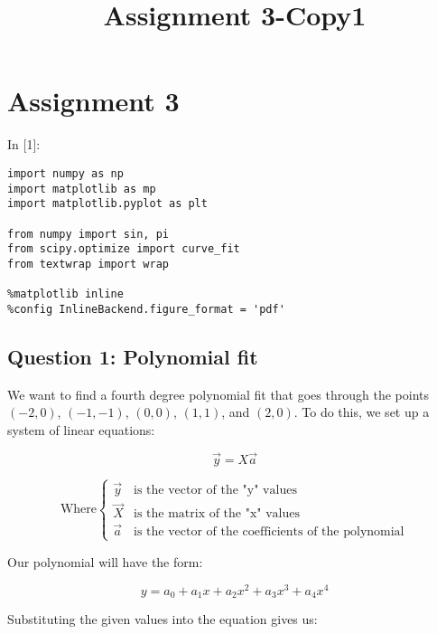 \documentclass[11pt]{article}
\title{Assignment 3-Copy1}
\newif\ifcode
\newif\ifleftmargins
\newlength{\promptlength}
\newcommand{\prompt}[3]{
        \needspace{1.1cm}
        \settowidth{\promptlength}{ #1 [#3] }
        \ifleftmargins\hspace{-\promptlength}\hspace{-5pt}\fi
        {\color{#2}#1 [#3]:}
        \ifleftmargins\vspace{-2.7ex}\fi
    }
\begin{document}
    
    
    
    
    

    
    \hypertarget{assignment-3}{%
\section{Assignment 3}\label{assignment-3}}

    
\prompt{In}{incolor}{1}
\codetrue
\begin{tcolorbox}[breakable, size=fbox, boxrule=1pt, pad at break*=1mm, colback=cellbackground, colframe=cellborder]
\begin{verbatim}
import numpy as np 
import matplotlib as mp
import matplotlib.pyplot as plt

from numpy import sin, pi
from scipy.optimize import curve_fit 
from textwrap import wrap

%matplotlib inline
%config InlineBackend.figure_format = 'pdf'
\end{verbatim}
\end{tcolorbox}
\codefalse

    \hypertarget{question-1-polynomial-fit}{%
\subsection{Question 1: Polynomial
fit}\label{question-1-polynomial-fit}}

    We want to find a fourth degree polynomial fit that goes through the
points \((-2, 0)\), \((-1, -1)\), \((0, 0)\), \((1, 1)\), and
\((2, 0)\). To do this, we set up a system of linear equations:

\[\vec{y} = X \vec{a}\]

\[\text{Where} \left\{ \begin{array}{ll}
            \vec{y}  & \text{is the vector of the "y" values} \\
            \vec{X}  & \text{is the matrix of the "x" values} \\
            \vec{a}  & \text{is the vector of the coefficients of the polynomial}
            \end{array} \right.\]

Our polynomial will have the form:

\[y = a_0 + a_1 x + a_2 x^2 + a_3 x^3 + a_4 x^4\]

Substituting the given values into the equation gives us:
\end{document}
